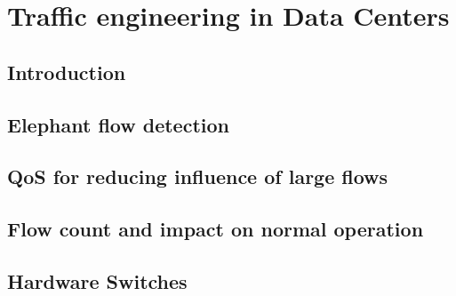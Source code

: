 \chapter{Traffic engineering in Data Centers} \label{chap:me} %

\section {Introduction}

\section {Elephant flow detection}
\section {QoS for reducing influence of large flows}
\section {Flow count and impact on normal operation}
\section {Hardware Switches}

